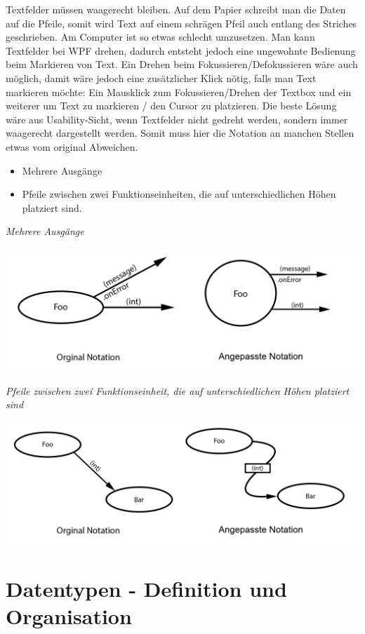 Textfelder müssen waagerecht bleiben. Auf dem Papier schreibt man die Daten auf
die Pfeile, somit wird Text auf einem schrägen Pfeil auch entlang des Striches
geschrieben.
Am Computer ist so etwas schlecht umzusetzen. Man kann Textfelder bei WPF drehen, dadurch
entsteht jedoch eine ungewohnte Bedienung beim Markieren von Text. Ein Drehen
beim Fokussieren/Defokussieren wäre auch möglich, damit wäre jedoch eine zusätzlicher
Klick nötig, falls man Text markieren möchte: Ein Mausklick zum Fokussieren/Drehen
der Textbox und ein weiterer um Text zu markieren / den Cursor zu platzieren.
Die beste Lösung wäre aus Usability-Sicht, wenn Textfelder nicht gedreht werden,
sondern immer waagerecht dargestellt werden. Somit muss hier die Notation an
manchen Stellen etwas vom original Abweichen.
\begin{itemize}
\item Mehrere Ausgänge
\item Pfeile zwischen zwei Funktionseinheiten, die auf unterschiedlichen Höhen platziert
sind.
\end{itemize}

\pagebreak
\emph{Mehrere Ausgänge}

\includegraphics[width=.9\linewidth]{./img/NotationChanges1.jpg}
\bigskip

\emph{
Pfeile zwischen zwei Funktionseinheit, die auf unterschiedlichen Höhen platziert
sind}

\includegraphics[width=.9\linewidth]{./img/NotationChanges2.jpg}



\section{Datentypen - Definition und Organisation}

